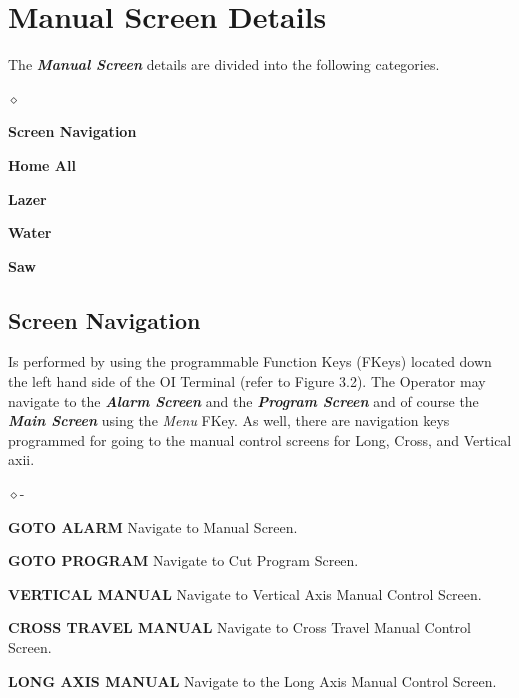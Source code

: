 \section{Manual Screen Details}
The \textbf{\textit{Manual Screen}} details are divided into the following categories.
\begin{list}{$\diamond$}{}
	\item \textbf{Screen Navigation}
	\item \textbf{Home All}
	\item \textbf{Lazer}
	\item \textbf{Water}
	\item \textbf{Saw}
\end{list}
\subsection{Screen Navigation}Is performed by using the programmable Function Keys (FKeys) located down the left hand side of the OI Terminal (refer to Figure 3.2). The Operator may navigate to the \textbf{\textit{Alarm Screen}} and the \textbf{\textit{Program Screen}} and of course the \textbf{\textit{Main Screen}} using the \textit{Menu} FKey. As well, there are navigation keys programmed for going to the manual control screens for Long, Cross, and Vertical axii.
\begin{list}{$\diamond$-}{}
	\item \textbf{GOTO ALARM} Navigate to Manual Screen.
	\item \textbf{GOTO PROGRAM} Navigate to Cut Program Screen.
	\item \textbf{VERTICAL MANUAL} Navigate to Vertical Axis Manual Control Screen.
	\item \textbf{CROSS TRAVEL MANUAL} Navigate to Cross Travel Manual Control Screen.
	\item \textbf{LONG AXIS MANUAL} Navigate to the Long Axis Manual Control Screen.
\end{list}
